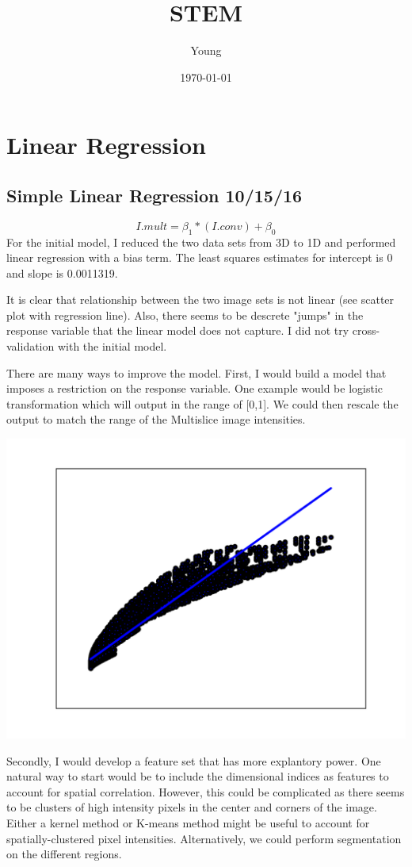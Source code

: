 \documentclass[11pt]{article}
\author{Young}
\date{\today}
\title{STEM}
\begin{document}
\maketitle
\tableofcontents


\section{Linear Regression}
\label{sec-1}
\subsection{Simple Linear Regression 10/15/16}
\label{sec-1-1}
\[I.mult = \beta_1*(I.conv)+\beta_0\]
For the initial model, I reduced the two data sets from 3D to 1D and
performed linear regression with a bias term. The least squares
estimates for intercept is 0 and slope is 0.0011319. 

It is clear that relationship between the two image sets is not linear
(see scatter plot with regression line). Also, there seems to be
descrete "jumps" in the response variable that the linear model does
not capture. I did not try cross-validation with the initial model.

There are many ways to improve the model. First, I would build a model
that imposes a restriction on the response variable. One example would
be logistic transformation which will output in the range of [0,1]. We
could then rescale the output to match the range of the Multislice
image intensities.  

\includegraphics[width=.9\linewidth]{./images/slr.png}

Secondly, I would develop a feature set that has more explantory
power. One natural way to start would be to include the dimensional
indices as features to account for spatial correlation. However, this
could be complicated as there seems to be clusters of high intensity
pixels in the center and corners of the image. Either a kernel method
or K-means method might be useful to account for spatially-clustered
pixel intensities. Alternatively, we could perform segmentation on the
different regions.
\end{document}
